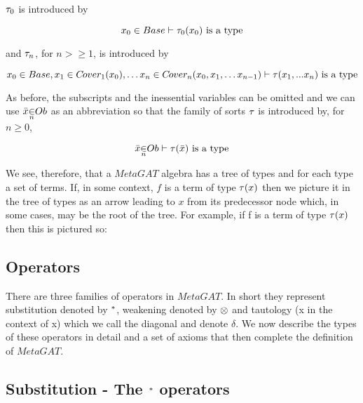 \documentclass[10pt,a4paper]{article}
\begin{document}
$\tau_0$ is introduced by

\vspace{0cm}
\begin{equation}
x_0 \in Base \vdash \tau_0(x_0)\mbox{ is a type}
\end{equation}

and $\tau_n$, for $n >\geq 1$, is introduced by

\vspace{0cm}
\begin{equation}
x_0 \in Base,x_1 \in C\kern-1pt over_{1}(x_0), \hdots x_n \in C\kern-1pt over_{n}(x_0,x_1,\hdots x_{n-1}) \vdash \tau(x_1,...x_n)\mbox{ is a type}
\end{equation}

As before, the subscripts and the inessential variables can be omitted and 
we can use $\ofTn{x}{n}{\genericOb}$ as an abbreviation so that the family of sorts $\tau$ is introduced by, for $n \geq 0$,

\vspace{0cm}
\begin{equation}
\label{sortintroterm}
\ofTn{x}{n}{\genericOb} \tstyle \isT{\trm(\bar{x})}
\end{equation}


\noindent We see, therefore, that a $MetaGAT$ algebra has a tree of types and for each type a set of terms.
If, in some context, $f$ is a term of type $\tau(x)$ then we picture it in the tree of types as an arrow leading to $x$ from its predecessor node which, in some cases, may be the root of the tree.
For example,  if f is a term of type $\tau(x)$ then this is pictured so:






\subsection*{Operators}
There are three families of operators in $MetaGAT$. In short they represent substitution  denoted by $^*$, weakening denoted by $\otimes$ and tautology (x in the context of x) which we call the diagonal and denote $\delta$. We now describe the
types of these operators in detail and a set of axioms that then complete the definition of $MetaGAT$. 

\subsection*{Substitution - The $^*$ operators}
\end{document}
